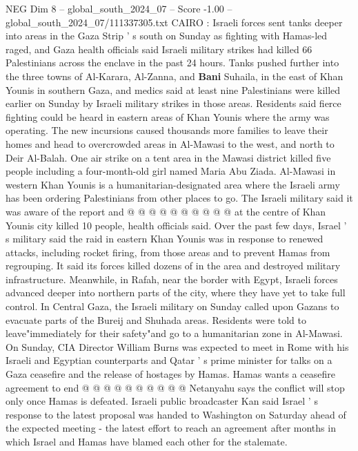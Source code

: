 \begin{textsample}{NEG Dim 8 – global\_south\_2024\_07 – Score -1.00 – global\_south\_2024\_07/111337305.txt}  \label{ex:f8_neg_355}
CAIRO : Israeli forces sent tanks deeper into areas in the Gaza Strip ' s south on Sunday as fighting with Hamas-led raged, and Gaza health officials said Israeli military strikes had killed 66 Palestinians across the enclave in the past 24 hours.
Tanks pushed further into the three towns of Al-Karara, Al-Zanna, and \textbf{Bani} Suhaila, in the east of Khan Younis in southern Gaza, and medics said at least nine Palestinians were killed earlier on Sunday by Israeli military strikes in those areas.
Residents said fierce fighting could be heard in eastern areas of Khan Younis where the army was operating.
The new incursions caused thousands more families to leave their homes and head to overcrowded areas in Al-Mawasi to the west, and north to Deir Al-Balah.
One air strike on a tent area in the Mawasi district killed five people including a four-month-old girl named Maria Abu Ziada.
Al-Mawasi in western Khan Younis is a humanitarian-designated area where the Israeli army has been ordering Palestinians from other places to go.
The Israeli military said it was aware of the report and @ @ @ @ @ @ @ @ @ @ at the centre of Khan Younis city killed 10 people, health officials said.
Over the past few days, Israel ' s military said the raid in eastern Khan Younis was in response to renewed attacks, including rocket firing, from those areas and to prevent Hamas from regrouping.
It said its forces killed dozens of in the area and destroyed military infrastructure.
Meanwhile, in Rafah, near the border with Egypt, Israeli forces advanced deeper into northern parts of the city, where they have yet to take full control.
In Central Gaza, the Israeli military on Sunday called upon Gazans to evacuate parts of the Bureij and Shuhada areas.
Residents were told to leave"immediately for their safety"and go to a humanitarian zone in Al-Mawasi.
On Sunday, CIA Director William Burns was expected to meet in Rome with his Israeli and Egyptian counterparts and Qatar ' s prime minister for talks on a Gaza ceasefire and the release of hostages by Hamas.
Hamas wants a ceasefire agreement to end @ @ @ @ @ @ @ @ @ @ Netanyahu says the conflict will stop only once Hamas is defeated.
Israeli public broadcaster Kan said Israel ' s response to the latest proposal was handed to Washington on Saturday ahead of the expected meeting - the latest effort to reach an agreement after months in which Israel and Hamas have blamed each other for the stalemate.

\end{textsample}

